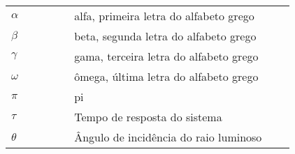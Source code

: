 

\begin{listasimb}

\begin{longtable}{p{0.2\linewidth}p{0.7\linewidth}}
$\alpha$ & alfa, primeira letra do alfabeto grego\\
$\beta$ & beta, segunda letra do alfabeto grego\\
$\gamma$ & gama, terceira letra do alfabeto grego\\
$\omega$ & ômega, última letra do alfabeto grego\\
$\pi$ & pi \\
$\tau$ & Tempo de resposta do sistema\\
$\theta$ & Ângulo de incidência do raio luminoso\\
\end{longtable}

\end{listasimb}

